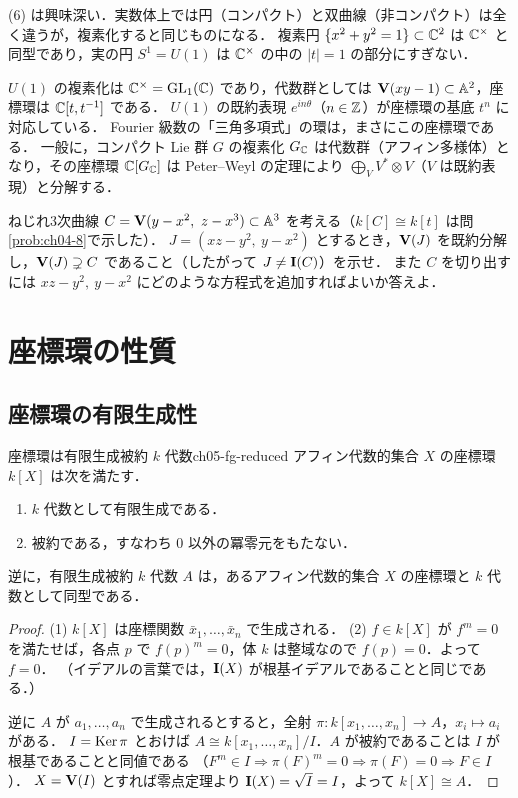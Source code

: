 (6) は興味深い．実数体上では円（コンパクト）と双曲線（非コンパクト）は全く違うが，複素化すると同じものになる．
複素円 $\{x^2+y^2=1\}\subset\mathbb{C}^2$ は $\mathbb{C}^\times$ と同型であり，実の円 $S^1=U(1)$ は $\mathbb{C}^\times$ の中の $|t|=1$ の部分にすぎない．

\begin{physbox}[$U(1)$ とその複素化]
$U(1)$ の複素化は $\mathbb{C}^\times=\operatorname{GL}_1(\mathbb{C})$ であり，代数群としては $\mathbf{V}(xy-1)\subset\mathbb{A}^2$，座標環は $\mathbb{C}[t,t^{-1}]$ である．
$U(1)$ の既約表現 $e^{in\theta}$（$n\in\mathbb{Z}$）が座標環の基底 $t^n$ に対応している．
Fourier 級数の「三角多項式」の環は，まさにこの座標環である．
一般に，コンパクト Lie 群 $G$ の複素化 $G_{\mathbb{C}}$ は代数群（アフィン多様体）となり，その座標環 $\mathbb{C}[G_{\mathbb{C}}]$ は
Peter--Weyl の定理により $\bigoplus_{V}V^*\otimes V$（$V$ は既約表現）と分解する．
\end{physbox}

ねじれ3次曲線 $C=\Zero(y-x^2,\ z-x^3)\subset\A^3$ を考える（$k[C]\cong k[t]$ は問\ref{prob:ch04-8}で示した）．
$J=(xz-y^2,\ y-x^2)$ とするとき，$\mathbf{V}(J)$ を既約分解し，$\mathbf{V}(J)\supsetneq C$ であること（したがって $J\ne\mathbf{I}(C)$）を示せ．
また $C$ を切り出すには $xz-y^2,\ y-x^2$ にどのような方程式を追加すればよいか答えよ．

\section{座標環の性質}

\subsection{座標環の有限生成性}

\begin{myprop}{座標環は有限生成被約 $k$ 代数}{ch05-fg-reduced}
アフィン代数的集合 $X$ の座標環 $k[X]$ は次を満たす．
\begin{enumerate}
  \item $k$ 代数として有限生成である．
  \item 被約である，すなわち $0$ 以外の冪零元をもたない．
\end{enumerate}
逆に，有限生成被約 $k$ 代数 $A$ は，あるアフィン代数的集合 $X$ の座標環と $k$ 代数として同型である．
\end{myprop}

\begin{proof}
(1) $k[X]$ は座標関数 $\bar x_1,\dots,\bar x_n$ で生成される．
(2) $f\in k[X]$ が $f^m=0$ を満たせば，各点 $p$ で $f(p)^m=0$，体 $k$ は整域なので $f(p)=0$．よって $f=0$．
（イデアルの言葉では，$\mathbf{I}(X)$ が根基イデアルであることと同じである．）

逆に $A$ が $a_1,\dots,a_n$ で生成されるとすると，全射 $\pi:k[x_1,\dots,x_n]\to A$，$x_i\mapsto a_i$ がある．
$I=\operatorname{Ker}\pi$ とおけば $A\cong k[x_1,\dots,x_n]/I$．$A$ が被約であることは $I$ が根基であることと同値である
（$F^m\in I\Rightarrow \pi(F)^m=0\Rightarrow\pi(F)=0\Rightarrow F\in I$）．
$X=\mathbf{V}(I)$ とすれば零点定理より $\mathbf{I}(X)=\sqrt I=I$，よって $k[X]\cong A$．
\end{proof}

